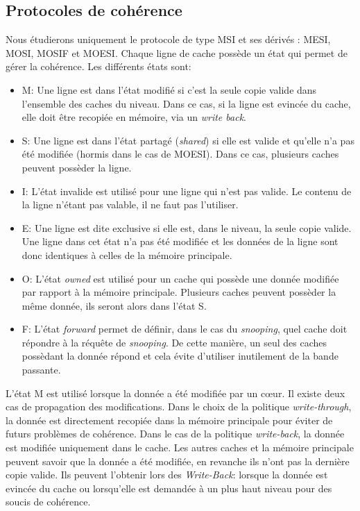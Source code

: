 \subsection{Protocoles de cohérence}
\label{coherence}
 Nous étudierons uniquement le protocole de type MSI et ses dérivés : MESI, MOSI, MOSIF et MOESI. Chaque ligne de cache possède un état qui permet de gérer la cohérence. Les différents états sont: \\
\begin{itemize}
\item M: Une ligne est dans l'état modifié si c'est la seule copie valide dans l'ensemble des caches du niveau. Dans ce cas, si la ligne est evincée du cache, elle doit être recopiée en mémoire, via un \emph{write back}. \\
\item S: Une ligne est dans l'état partagé (\textit{shared}) si elle est valide et qu'elle n'a pas été modifiée (hormis dans le cas de MOESI). Dans ce cas, plusieurs caches peuvent possèder la ligne. \\
\item I: L'état invalide est utilisé pour une ligne qui n'est pas valide. Le contenu de la ligne n'étant pas valable, il ne faut pas l'utiliser. \\
\item E: Une ligne est dite exclusive si elle est, dans le niveau, la seule copie valide. Une ligne dans cet état n'a pas été modifiée et les données de la ligne sont donc identiques à celles de la mémoire principale. \\
\item O: L'état \textit{owned} est utilisé pour un cache qui possède une donnée modifiée par rapport à la mémoire principale. Plusieurs caches peuvent possèder la même donnée, ils seront alors dans l'état S. \\
\item F: L'état \textit{forward} permet de définir, dans le cas du \emph{snooping}, quel cache doit répondre à la réquête de \emph{snooping}. De cette manière, un seul des caches possèdant la donnée répond et cela évite d'utiliser inutilement de la bande passante.\\
\end{itemize}

L'état M est utilisé lorsque la donnée a été modifiée par un c{\oe}ur. Il existe deux cas de propagation des modifications. Dans le choix de la politique \textit{write-through}, la donnée est directement recopiée dans la mémoire principale pour éviter de futurs problèmes de cohérence. Dans le cas de la politique \textit{write-back}, la donnée est modifiée uniquement dans le cache. Les autres caches et la mémoire principale peuvent savoir que la donnée a été modifiée, en revanche ils n'ont pas la dernière copie valide. Ils peuvent l'obtenir lors des \textit{Write-Back}: lorsque la donnée est evincée du cache ou lorsqu'elle est demandée à un plus haut niveau pour des soucis de cohérence.\\

